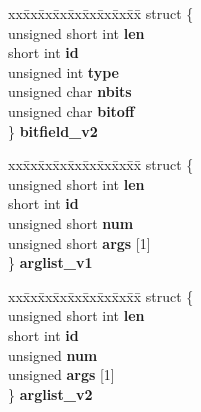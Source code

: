\begin{DoxyCompactItemize}
\begin{tabbing}
\end{tabbing}\item 
\mbox{\label{unioncodeview__reftype_ab4ea476642c8c21729e59fa815fa24ea}} 
\begin{tabbing}
xx\=xx\=xx\=xx\=xx\=xx\=xx\=xx\=xx\=\kill
struct \{\\
\>unsigned short int {\bfseries len}\\
\>short int {\bfseries id}\\
\>unsigned int {\bfseries type}\\
\>unsigned char {\bfseries nbits}\\
\>unsigned char {\bfseries bitoff}\\
\} {\bfseries bitfield\_v2}\\

\end{tabbing}\item 
\mbox{\label{unioncodeview__reftype_aa81784a9c272f34980fc5f5a809bad57}} 
\begin{tabbing}
xx\=xx\=xx\=xx\=xx\=xx\=xx\=xx\=xx\=\kill
struct \{\\
\>unsigned short int {\bfseries len}\\
\>short int {\bfseries id}\\
\>unsigned short {\bfseries num}\\
\>unsigned short {\bfseries args} \mbox{[}1\mbox{]}\\
\} {\bfseries arglist\_v1}\\

\end{tabbing}\item 
\mbox{\label{unioncodeview__reftype_a43cf8f8b2f0b08898b59247325a79526}} 
\begin{tabbing}
xx\=xx\=xx\=xx\=xx\=xx\=xx\=xx\=xx\=\kill
struct \{\\
\>unsigned short int {\bfseries len}\\
\>short int {\bfseries id}\\
\>unsigned {\bfseries num}\\
\>unsigned {\bfseries args} \mbox{[}1\mbox{]}\\
\} {\bfseries arglist\_v2}\\


\end{tabbing}
\end{DoxyCompactItemize}
